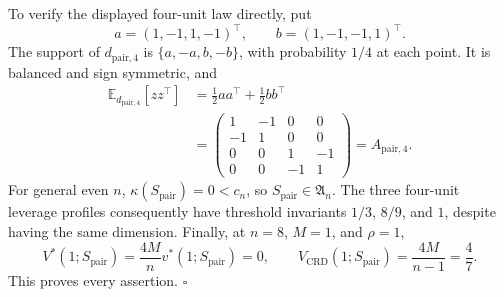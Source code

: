 To verify the displayed four-unit law directly, put
\[
a=(1,-1,1,-1)^\top,
\qquad
b=(1,-1,-1,1)^\top.
\]
The support of \(d_{\mathrm{pair},4}\) is \(\{a,-a,b,-b\}\), with probability \(1/4\) at each point.  It is balanced and sign symmetric, and
\[
\begin{aligned}
\mathbb E_{d_{\mathrm{pair},4}}[zz^\top]
&=\frac12aa^\top+\frac12bb^\top\\
&=\begin{pmatrix}
1&-1&0&0\\
-1&1&0&0\\
0&0&1&-1\\
0&0&-1&1
\end{pmatrix}
=A_{\mathrm{pair},4}.
\end{aligned}
\tag{20}
\]
For general even \(n\), \(\kappa(S_{\mathrm{pair}})=0<c_n\), so \(S_{\mathrm{pair}}\in\mathfrak A_n\).  The three four-unit leverage profiles consequently have threshold invariants \(1/3\), \(8/9\), and \(1\), despite having the same dimension.  Finally, at \(n=8\), \(M=1\), and \(\rho=1\),
\[
V^*(1;S_{\mathrm{pair}})=\frac{4M}{n}v^*(1;S_{\mathrm{pair}})=0,
\qquad
V_{\mathrm{CRD}}(1;S_{\mathrm{pair}})=\frac{4M}{n-1}=\frac47.
\tag{21}
\]
This proves every assertion. \(\square\)